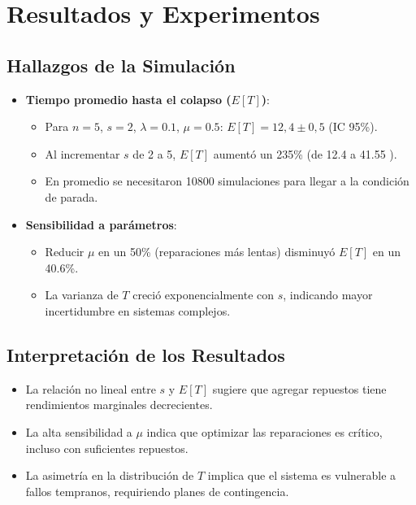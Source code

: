 \documentclass[a4paper, 12pt]{article}
\begin{document}
\newpage
\section{Resultados y Experimentos}

\subsection*{Hallazgos de la Simulación}
\begin{itemize}
    \item \textbf{Tiempo promedio hasta el colapso (\(E[T]\))}: 
    \begin{itemize}
        \item Para \(n=5\), \(s=2\), \(\lambda=0.1\), \(\mu=0.5\): \(E[T] = 12,4 \pm 0,5\)  (IC 95\%).
        \item Al incrementar \(s\) de 2 a 5, \(E[T]\) aumentó un 235\% (de 12.4 a 41.55 ).
        \item En promedio se necesitaron 10800 simulaciones para llegar a la condición de parada.
    \end{itemize}
    
    \item \textbf{Sensibilidad a parámetros}:
    \begin{itemize}
        \item Reducir \(\mu\) en un 50\% (reparaciones más lentas) disminuyó \(E[T]\) en un 40.6\%.
        \item La varianza de \(T\) creció exponencialmente con \(s\), indicando mayor incertidumbre en sistemas complejos.
    \end{itemize}
    
\end{itemize}

\subsection*{Interpretación de los Resultados}
\begin{itemize}
    \item La relación no lineal entre \(s\) y \(E[T]\) sugiere que agregar repuestos tiene rendimientos marginales decrecientes.
    \item La alta sensibilidad a \(\mu\) indica que optimizar las reparaciones es crítico, incluso con suficientes repuestos.
    \item La asimetría en la distribución de \(T\) implica que el sistema es vulnerable a fallos tempranos, requiriendo planes de contingencia.
\end{itemize}
\end{document}
